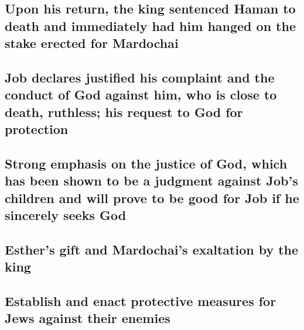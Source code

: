 \begin{paracol}{2}
\begin{otherlanguage}{english}
\hypertarget{upon-his-return-the-king-sentenced-haman-to-death-and-immediately-had-him-hanged-on-the-stake-erected-for-mardochai}{%
\subsection{Upon his return, the king sentenced Haman to death and
immediately had him hanged on the stake erected for
Mardochai}\label{upon-his-return-the-king-sentenced-haman-to-death-and-immediately-had-him-hanged-on-the-stake-erected-for-mardochai}}

\hypertarget{job-declares-justified-his-complaint-and-the-conduct-of-god-against-him-who-is-close-to-death-ruthless-his-request-to-god-for-protection}{%
\subsection{Job declares justified his complaint and the conduct of God
against him, who is close to death, ruthless; his request to God for
protection}\label{job-declares-justified-his-complaint-and-the-conduct-of-god-against-him-who-is-close-to-death-ruthless-his-request-to-god-for-protection}}

\hypertarget{strong-emphasis-on-the-justice-of-god-which-has-been-shown-to-be-a-judgment-against-jobs-children-and-will-prove-to-be-good-for-job-if-he-sincerely-seeks-god}{%
\subsection{Strong emphasis on the justice of God, which has been shown
to be a judgment against Job's children and will prove to be good for
Job if he sincerely seeks
God}\label{strong-emphasis-on-the-justice-of-god-which-has-been-shown-to-be-a-judgment-against-jobs-children-and-will-prove-to-be-good-for-job-if-he-sincerely-seeks-god}}

\hypertarget{esthers-gift-and-mardochais-exaltation-by-the-king}{%
\subsection{Esther's gift and Mardochai's exaltation by the
king}\label{esthers-gift-and-mardochais-exaltation-by-the-king}}

\hypertarget{establish-and-enact-protective-measures-for-jews-against-their-enemies}{%
\subsection{Establish and enact protective measures for Jews against
their
enemies}\label{establish-and-enact-protective-measures-for-jews-against-their-enemies}}


\end{otherlanguage}
\end{paracol}
